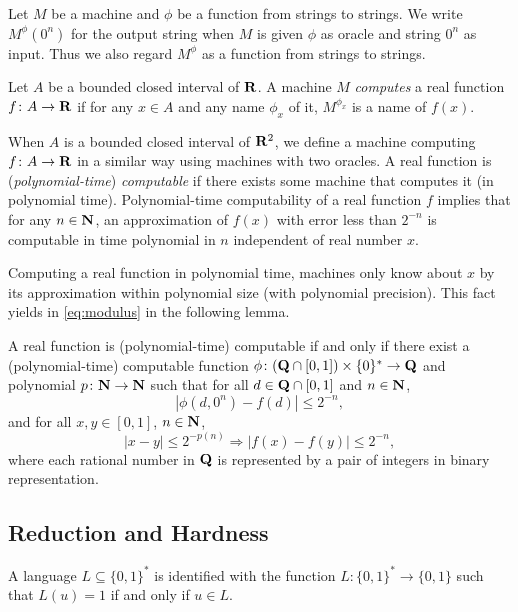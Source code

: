 Let $M$ be a machine and $\phi$ be a function from strings to strings. 
We write $M ^\phi (0 ^n)$ for the output string 
when $M$ is given
$\phi$ as oracle and string $0^n$ as input.
Thus we also regard $M^\phi$ as a function from strings to strings.

\begin{definition}
Let $A$ be a bounded closed interval of $\mathbf R$.
A machine $M$ \emph{computes} a real function $f \colon A \to \mathbf R$ 
if for any $x \in A$ and any name $\phi_x$ of it,
$M^{\phi_x}$ is a name of $f(x)$.
\end{definition}

When $A$ is a bounded closed interval of $\mathbf R ^2$,
we define a machine computing $f \colon A \to \mathbf R$ in a similar way using machines with two oracles.
A real function is (\emph{polynomial-time}) \emph{computable} if there exists some machine that computes it (in polynomial time).
Polynomial-time computability of a real function $f$ implies that
for any $n \in \mathbf N$, 
an approximation of $f(x)$ with error less than $2^{-n}$
is computable in time polynomial in $n$ 
independent of real number $x$.

Computing a real function in polynomial time, machines only know
about $x$ by its approximation within polynomial size (with polynomial precision).
This fact yields in \eqref{eq:modulus} in the following lemma.

\begin{lemma}
 \label{lem:type1representation}
 A real function is (polynomial-time) computable if and only if
 there exist a (polynomial-time) computable function 
 $\phi \colon (\mathbf Q \cap [0, 1]) \times \{0\} ^* \to \mathbf Q$ and 
 polynomial $p \colon \mathbf N \to \mathbf N$ such that
 for all $d \in \mathbf Q \cap [0,1]$ and $n \in \mathbf N$,
 \begin{equation}
  |\phi(d, 0^n) - f(d)| \le 2^{-n},
 \end{equation}
 and for all $x, y \in [0, 1]$, $n \in \mathbf N$,
 \begin{equation} 
  |x-y| \le 2^{-p(n)} \Rightarrow |f(x) - f(y)| \le 2^{-n},
   \label{eq:modulus}
 \end{equation}
 where each rational number in $\mathbf Q$ is represented by a pair of integers in binary representation.
\end{lemma}

\subsection{Reduction and Hardness}
A language $L \subseteq \{0, 1\} ^*$ is identified with the function
$L \colon \{0, 1\} ^* \to \{0, 1\}$ such that $L (u) = 1$ if and only if $u \in L$.

